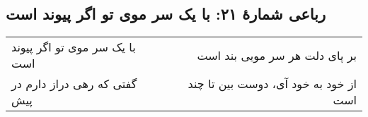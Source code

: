\begin{center}
\section*{رباعی شمارهٔ ۲۱: با یک سر موی تو اگر پیوند است}
\label{sec:021}
\begin{longtable}{l p{0.5cm} r}
با یک سر موی تو اگر پیوند است
&&
بر پای دلت هر سر مویی بند است
\\
گفتی که رهی دراز دارم در پیش
&&
از خود به خود آی، دوست بین تا چند است
\\
\end{longtable}
\end{center}
